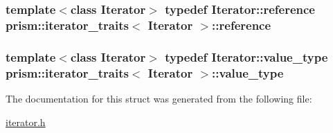 \subsubsection[{\texorpdfstring{reference}{reference}}]{\setlength{\rightskip}{0pt plus 5cm}template$<$class Iterator$>$ typedef Iterator\+::reference {\bf prism\+::iterator\+\_\+traits}$<$ Iterator $>$\+::{\bf reference}}\hypertarget{structprism_1_1iterator__traits_a18c26ae6eea81bdaeb3bd4e15038eca7}{}\label{structprism_1_1iterator__traits_a18c26ae6eea81bdaeb3bd4e15038eca7}
\subsubsection[{\texorpdfstring{value\+\_\+type}{value_type}}]{\setlength{\rightskip}{0pt plus 5cm}template$<$class Iterator$>$ typedef Iterator\+::value\+\_\+type {\bf prism\+::iterator\+\_\+traits}$<$ Iterator $>$\+::{\bf value\+\_\+type}}\hypertarget{structprism_1_1iterator__traits_a897219622ddfbb1f94aba0cc575cb30c}{}\label{structprism_1_1iterator__traits_a897219622ddfbb1f94aba0cc575cb30c}


The documentation for this struct was generated from the following file\+:\begin{DoxyCompactItemize}
\item 
\hyperlink{iterator_8h}{iterator.\+h}\end{DoxyCompactItemize}
